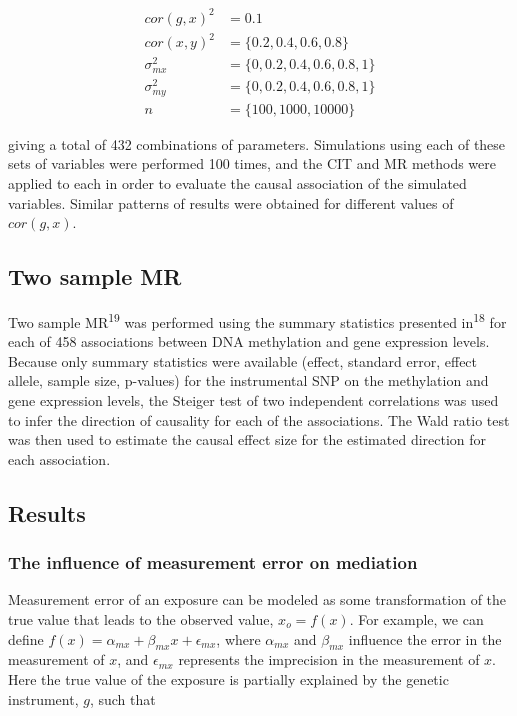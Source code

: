 \documentclass[]{article}
\begin{document}
\[
\begin{aligned}
cor(g, x)^2 & = 0.1 \\
cor(x, y)^2 & = \{0.2, 0.4, 0.6, 0.8\} \\
\sigma^2_{mx} & = \{0, 0.2, 0.4, 0.6, 0.8, 1\} \\
\sigma^2_{my} & = \{0, 0.2, 0.4, 0.6, 0.8, 1\} \\
n & = \{100, 1000, 10000\}
\end{aligned}
\]

giving a total of 432 combinations of parameters. Simulations using each
of these sets of variables were performed 100 times, and the CIT and MR
methods were applied to each in order to evaluate the causal association
of the simulated variables. Similar patterns of results were obtained
for different values of \(cor(g, x)\).

\subsection{Two sample MR}\label{two-sample-mr}

Two sample MR\textsuperscript{19} was performed using the summary
statistics presented in\textsuperscript{18} for each of 458 associations
between DNA methylation and gene expression levels. Because only summary
statistics were available (effect, standard error, effect allele, sample
size, p-values) for the instrumental SNP on the methylation and gene
expression levels, the Steiger test of two independent correlations was
used to infer the direction of causality for each of the associations.
The Wald ratio test was then used to estimate the causal effect size for
the estimated direction for each association.

\subsection{Results}\label{results}

\subsubsection{The influence of measurement error on
mediation}\label{the-influence-of-measurement-error-on-mediation}

Measurement error of an exposure can be modeled as some transformation
of the true value that leads to the observed value, \(x_o = f(x)\). For
example, we can define
\(f(x) = \alpha_{mx} + \beta_{mx} x + \epsilon_{mx}\), where
\(\alpha_{mx}\) and \(\beta_{mx}\) influence the error in the
measurement of \(x\), and \(\epsilon_{mx}\) represents the imprecision
in the measurement of \(x\). Here the true value of the exposure is
partially explained by the genetic instrument, \(g\), such that
\end{document}
